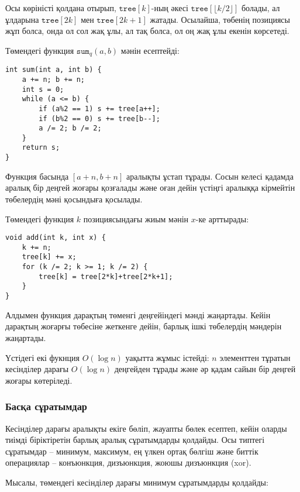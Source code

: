 Осы көріністі қолдана отырып,
$\texttt{tree}[k]$-ның әкесі 
$\texttt{tree}[\lfloor k/2 \rfloor]$ болады,
ал ұлдарына $\texttt{tree}[2k]$
мен $\texttt{tree}[2k+1]$ жатады.
Осылайша, төбенің позициясы жұп болса, онда ол сол жақ ұлы,
ал тақ болса, ол оң жақ ұлы екенін көрсетеді. 

Төмендегі функция $\texttt{sum}_q(a,b)$
мәнін есептейді:
\begin{lstlisting}
int sum(int a, int b) {
    a += n; b += n;
    int s = 0;
    while (a <= b) {
        if (a%2 == 1) s += tree[a++];
        if (b%2 == 0) s += tree[b--];
        a /= 2; b /= 2;
    }
    return s;
}
\end{lstlisting}
Функция басында $[a+n,b+n]$ аралықты
ұстап тұрады. Сосын келесі қадамда
аралық бір деңгей жоғары қозғалады 
және оған дейін үстіңгі аралыққа 
кірмейтін төбелердің мәні қосындыға қосылады.

Төмендегі функция $k$ позициясындағы жиым мәнін 
$x$-ке арттырады:
\begin{lstlisting}
void add(int k, int x) {
    k += n;
    tree[k] += x;
    for (k /= 2; k >= 1; k /= 2) {
        tree[k] = tree[2*k]+tree[2*k+1];
    }
}
\end{lstlisting}
Алдымен функция дарақтың төменгі 
деңгейіндегі мәнді жаңартады.
Кейін дарақтың жоғарғы 
төбесіне жеткенге дейін, барлық ішкі 
төбелердің мәндерін жаңартады.

Үстідегі екі фукнция $O(\log n)$ уақытта
жұмыс істейді: $n$ элементтен тұратын
кесінділер дарағы $O(\log n)$ деңгейден
тұрады және әр қадам сайын 
бір деңгей жоғары көтеріледі. 

\subsubsection{Басқа сұратымдар}

Кесінділер дарағы аралықты екіге бөліп,
жауапты бөлек есептеп, кейін оларды тиімді 
біріктіретін барлық аралық сұратымдарды қолдайды. 
Осы типтегі сұратымдар -- минимум, максимум, ең үлкен 
ортақ бөлгіш және биттік операциялар -- конъюнкция, дизъюнкция, жоюшы дизъюнкция (xor). %

Мысалы, төмендегі кесінділер дарағы минимум
сұратымдарды қолдайды:

